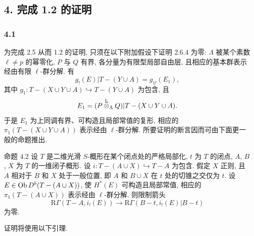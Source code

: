 \subsection*{4. 完成 1.2 的证明}

\subsubsection*{4.1}
为完成 2.5 从而 1.2 的证明, 只须在以下附加假设下证明 2.6.4 为零: $\Lambda$ 被某个素数 $\ell\ne p$ 的幂零化, $P$ 与 $Q$ 有界, 各分量为有限型局部自由层, 且相应的基本群表示经由有限 $\ell$-群分解. 有
\[
g_!(E)|T-(Y\cup A)=g_{1!}(E_1),
\]
其中 $g_1:T-(X\cup Y\cup A)\hookrightarrow T-(Y\cup A)$ 为包含, 且
\[
E_1=(P\overset{\mathrm L}{\otimes}_{\Lambda}Q)|T-(X\cup Y\cup A).
\]
于是 $E_1$ 为上同调有界、可构造且局部常值的复形, 相应的 $\pi_1(T-(X\cup Y\cup A))$ 表示经由 $\ell$-群分解. 所要证明的断言因而可由下面更一般的命题推出.

\begin{statement}{命题 4.2}
设 $T$ 是二维光滑 $S$-概形在某个闭点处的严格局部化, $t$ 为 $T$ 的闭点, $A$, $B$, $X$ 为 $T$ 的一维闭子概形. 设 $i:T-(A\cup X)\hookrightarrow T-A$ 为包含. 假定 $X$ 正则, 且 $A$ 相对于 $B$ 和 $X$ 处于一般位置, 即 $A$ 和 $B\cup X$ 在 $t$ 处的切锥之交仅为 $t$. 设 $E\in\operatorname{Ob} D^b(T-(A\cup X))$, 使 $H^*(E)$ 可构造且局部常值, 相应的 $\pi_1(T-(A\cup X))$ 表示经由 $\ell$-群分解. 则限制箭头
\[
\mathrm R\Gamma(T-A,i_!(E))
\longrightarrow
\mathrm R\Gamma(B-t,i_!(E)|B-t)
\]
为零.
\end{statement}

证明将使用以下引理.

